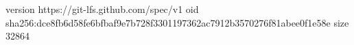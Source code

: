version https://git-lfs.github.com/spec/v1
oid sha256:dce8fb6d58fe6bfbaf9e7b728f3301197362ac7912b3570276f81abee0f1e58e
size 32864
